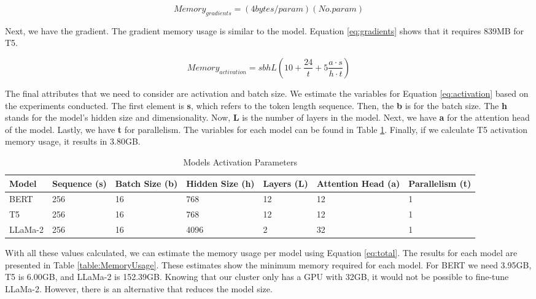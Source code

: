 \[ Memory_{gradients} = (4 bytes/param) (No. param) \label{eq:gradients} \tag{3} \] 

Next, we have the gradient. The gradient memory usage is similar to the model. Equation \ref{eq:gradients} shows that it requires 839MB for T5.


\[ Memory_{activation} = sbhL(10 + \frac{24}{t} + 5 \frac{a \cdot s}{h \cdot t} ) \label{eq:activation} \tag{4} \] 

The final attributes that we need to consider are activation and batch size. We estimate the variables for Equation \ref{eq:activation} based on the experiments conducted. The first element is \textbf{s}, which refers to the token length sequence. Then, the \textbf{b} is for the batch size. The \textbf{h} stands for the model's hidden size and dimensionality. Now, \textbf{L} is the number of layers in the model. Next, we have \textbf{a} for the attention head of the model. Lastly, we have \textbf{t} for parallelism. The variables for each model can be found in Table \ref{table:ModelActivation}. Finally, if we calculate T5 activation memory usage, it results in 3.80GB.

\begin{table}[H]
	\centering
	\caption{Models Activation Parameters}
	\begin{tabular}{||p{1.75cm} | p{2cm} | p{1.75cm} | p{1.75cm} | p{1.5cm} | p{2cm} | p{2.75cm}||} 
		\hline
		\textbf{Model} & \textbf{Sequence (s)} & \textbf{Batch Size (b)} & \textbf{Hidden Size (h)} & \textbf{Layers (L)} & \textbf{Attention Head (a)} & \textbf{Parallelism (t)} \\ [1ex] 
		\hline
		BERT & 256 & 16 & 768 & 12 & 12 & 1 \\ [1ex]
		\hline
		T5 & 256 & 16 & 768 & 12 & 12 & 1  \\[1ex]
		\hline
		LLaMa-2 & 256 & 16 & 4096 & 2 & 32 & 1  \\[1ex]
		\hline
	\end{tabular}
	\label{table:ModelActivation}
\end{table}


With all these values calculated, we can estimate the memory usage per model using Equation \ref{eq:total}. The results for each model are presented in Table \ref{table:MemoryUsage}. These estimates show the minimum memory required for each model. For BERT we need 3.95GB, T5 is 6.00GB, and LLaMa-2 is 152.39GB. Knowing that our cluster only has a GPU with 32GB, it would not be possible to fine-tune LLaMa-2. However, there is an alternative that reduces the model size.
	
